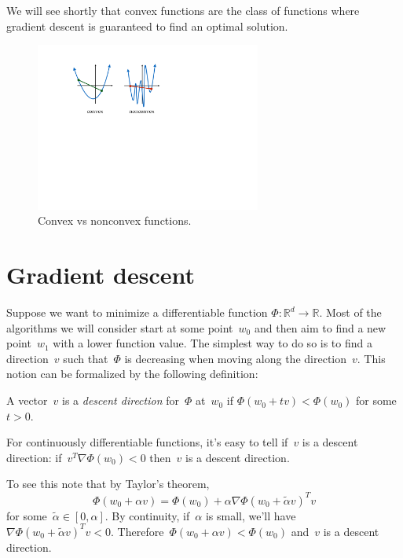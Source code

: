 \documentclass{tufte-book}
\begin{document}
We will see shortly that convex functions are the class of functions
where gradient descent is guaranteed to find an optimal solution.

\begin{figure}
\centering
\includegraphics[width=0.66\textwidth,height=\textheight]{assets/convex}
\caption{Convex vs nonconvex functions.}
\end{figure}

\hypertarget{gradient-descent}{%
\section{Gradient descent}\label{gradient-descent}}

Suppose we want to minimize a differentiable function
\(\Phi\colon\mathbb{R}^d \rightarrow \mathbb{R}\). Most of the
algorithms we will consider start at some point~\(w_0\) and then aim to
find a new point~\(w_1\) with a lower function value. The simplest way
to do so is to find a direction~\(v\) such that~\(\Phi\) is decreasing
when moving along the direction~\(v\). This notion can be formalized by
the following definition:

\begin{Definition}

A vector~\(v\) is a \emph{descent direction} for~\(\Phi\) at~\(w_0\) if
\(\Phi(w_0 + tv) < \Phi(w_0)\) for some~\(t>0\).

\end{Definition}

For continuously differentiable functions, it's easy to tell if~\(v\) is
a descent direction: if~\(v^T \nabla \Phi(w_0) <0\) then~\(v\) is a
descent direction.

To see this note that by Taylor's theorem, \[
\Phi(w_0 + \alpha v) = \Phi(w_0) + \alpha \nabla \Phi(w_0 + \tilde{\alpha} v)^T v
\] for some~\(\tilde{\alpha} \in [0,\alpha]\). By continuity,
if~\(\alpha\) is small, we'll
have~\(\nabla \Phi(w_0 + \tilde{\alpha} v)^Tv <0\).
Therefore~\(\Phi(w_0 + \alpha v) < \Phi(w_0)\) and~\(v\) is a descent
direction.
\end{document}
